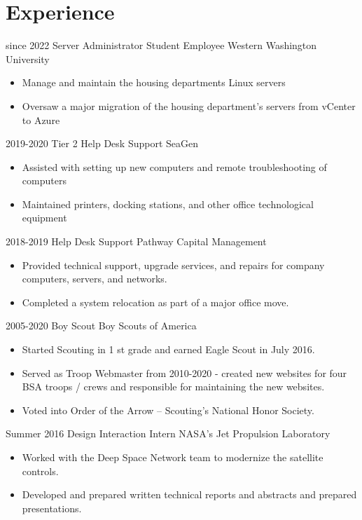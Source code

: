 \documentclass[letterpaper]{twentysecondcv} %
\begin{document}

\section{Experience}

\begin{twenty} %
	\twentyitem
		{since 2022}
		{Server Administrator Student Employee}
		{Western Washington University}
		{\begin{itemize}
			\item Manage and maintain the housing departments Linux servers
			\item Oversaw a major migration of the housing department's servers from vCenter to Azure
		\end{itemize}}
	\twentyitem
		{2019-2020}
		{Tier 2 Help Desk Support}
		{SeaGen}
		{\begin{itemize}
			\item Assisted with setting up new computers and remote troubleshooting of computers
			\item Maintained printers, docking stations, and other office technological equipment
		\end{itemize}}
	\twentyitem
		{2018-2019}
		{Help Desk Support}
		{Pathway Capital Management}
		{\begin{itemize}
			\item Provided technical support, upgrade services, and repairs for company computers, servers, and
			networks.
			\item Completed a system relocation as part of a major office move.
		\end{itemize}}
	\twentyitem
		{2005-2020}
		{Boy Scout}
		{Boy Scouts of America}
		{\begin{itemize}
			\item Started Scouting in 1 st grade and earned Eagle Scout in July 2016.
			\item Served as Troop Webmaster from 2010-2020 - created new websites for four BSA troops / crews and
			responsible for maintaining the new websites.
			\item Voted into Order of the Arrow – Scouting’s National Honor Society.
		\end{itemize}}
	\twentyitem
		{Summer 2016}
		{Design Interaction Intern}
		{NASA's Jet Propulsion Laboratory}
		{\begin{itemize}
			\item Worked with the Deep Space Network team to modernize the satellite controls.
			\item Developed and prepared written technical reports and abstracts and prepared presentations.
		\end{itemize}}
\end{twenty}
\end{document}

